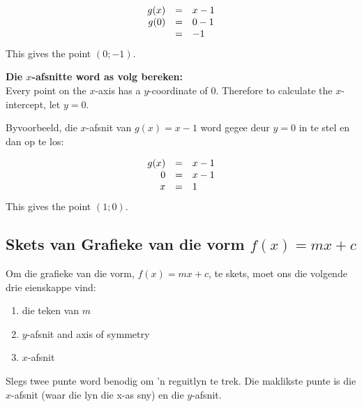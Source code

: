 \begin{equation*}
\begin{array}{ccl}\hfill g(x)& =& x-1\hfill \\
\hfill g(0) &=& 0-1\hfill \\
& =& -1\hfill 
\end{array}
\end{equation*}
This gives the point $(0;-1)$.\par

\textbf{Die $x$-afsnitte word as volg bereken:}\\
Every point on the $x$-axis has a $y$-coordinate of $0$. Therefore to calculate the $x$-intercept, let $y=0$. \par
Byvoorbeeld, die $x$-afsnit van $g(x)=x-1$ word gegee deur $y=0$ in te stel en dan op te los:\par 

\begin{equation*}
\begin{array}{ccl}\hfill g(x)& =& x-1\hfill \\
\hfill 0& =& x-1\hfill \\
\hfill x& =& 1\hfill 
\end{array}
\end{equation*}
This gives the point $(1;0)$.


\subsection*{Skets van Grafieke van die vorm $f(x)=mx+c$}


Om die grafieke van die vorm, $f(x)=mx+c$, te skets, moet ons die volgende drie eienskappe vind:\par 
\begin{enumerate}[noitemsep, label=\textbf{\arabic*}. ] 
\item die teken van $m$
\item $y$-afsnit
 and axis of symmetry\item $x$-afsnit
\end{enumerate}
Slegs twee punte word benodig om ’n reguitlyn te trek. Die maklikste punte is die $x$-afsnit (waar die lyn die x-as
sny) en die $y$-afsnit.\par 

